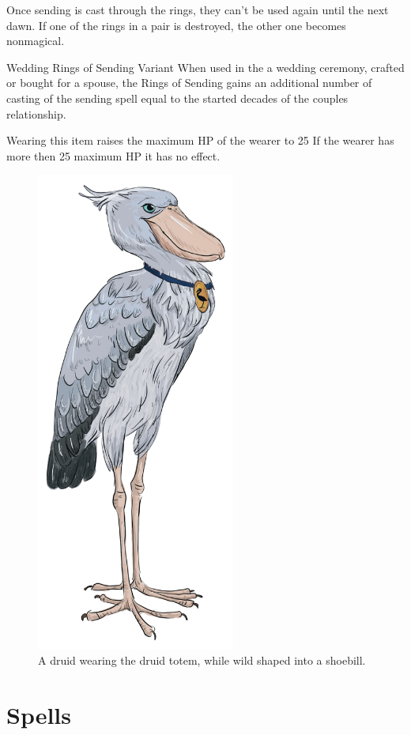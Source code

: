 \documentclass[letter,10pt,twocolumn,openany]{dndbook}
\begin{document}
Once sending is cast through the rings, they can't be used again until the next dawn.
If one of the rings in a pair is destroyed, the other one becomes nonmagical.

\begin{DndComment}{Wedding Rings of Sending Variant}
    When used in the a wedding ceremony, crafted or bought for a spouse,
    the Rings of Sending gains an additional number of casting of the sending spell equal to the started decades of the couples relationship.
\end{DndComment}

Wearing this item raises the maximum HP of the wearer to 25
If the wearer has more then 25 maximum HP it has no effect.

\begin{figure}
    \includegraphics[width=6.5cm]{images/shoebill.png}
    \caption{A druid wearing the druid totem, while wild shaped into a shoebill.}
\end{figure}

\chapter{Spells}
\end{document}
